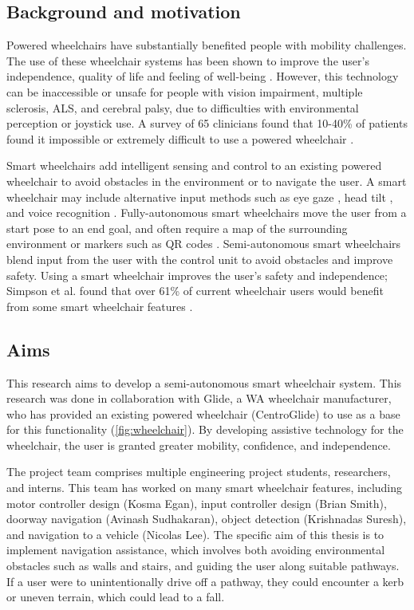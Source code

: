 \subsection{Background and motivation}
Powered wheelchairs have substantially benefited people with mobility challenges.
The use of these wheelchair systems has been shown to improve the user's independence, quality
of life and feeling of well-being \cite{treflerOutcomesWheelchairSystems2004}.
However, this technology can be inaccessible or unsafe for people with vision impairment,
multiple sclerosis, ALS, and cerebral palsy, due to difficulties with environmental perception
or joystick use. A survey of 65 clinicians found that 10-40\% of patients found it impossible or
extremely difficult to use a powered wheelchair \cite{fehrAdequacyPowerWheelchair2000}.

Smart wheelchairs add intelligent sensing and control to an existing powered wheelchair
to avoid obstacles in the environment or to navigate the user.
A smart wheelchair may include alternative input methods such as
eye gaze \cite{eidNovelEyeGazeControlledWheelchair2016}, head tilt \cite{tomariEnhancingWheelchairControl2014},
and voice recognition \cite{bakouriSteeringRoboticWheelchair2022}.
Fully-autonomous smart wheelchairs move the user from a start pose to an end goal,
and often require a map of the surrounding environment or markers
such as QR codes \cite{habhaAutonomousWheelchairIndoorOutdoor2021}.
Semi-autonomous smart wheelchairs blend input from the user with the control unit
to avoid obstacles and improve safety. Using a smart wheelchair improves the user's
safety and independence; Simpson et al. found that over 61\% of
current wheelchair users would benefit from some smart wheelchair features \cite{simpsonHowManyPeople2008}.

\subsection{Aims}
This research aims to develop a semi-autonomous smart wheelchair system.
This research was done in collaboration with Glide, a WA wheelchair manufacturer,
who has provided an existing powered wheelchair (CentroGlide) to use as a base
for this functionality (\cref{fig:wheelchair}). By developing assistive technology for the wheelchair,
the user is granted greater mobility, confidence, and independence.

The project team comprises multiple engineering project students, researchers, and interns.
This team has worked on many smart wheelchair features, including motor controller design (Kosma Egan),
input controller design (Brian Smith), doorway navigation (Avinash Sudhakaran),
object detection (Krishnadas Suresh), and navigation to a vehicle (Nicolas Lee).
The specific aim of this thesis is to implement navigation assistance,
which involves both avoiding environmental obstacles such as walls and stairs,
and guiding the user along suitable pathways. If a user were to unintentionally
drive off a pathway, they could encounter a kerb or uneven terrain, which could lead
to a fall.

